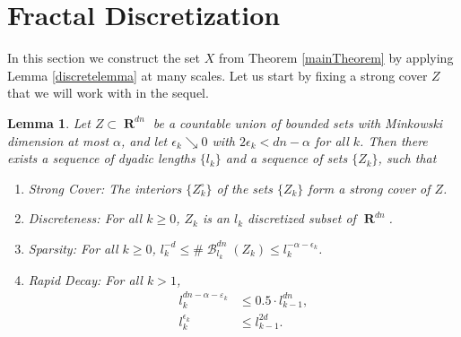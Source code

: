 \documentclass[dvipsnames,letterpaper,12pt]{article}
\numberwithin{equation}{section}
\theoremstyle{plain}
\newtheorem{lemma}{Lemma}
\theoremstyle{remark}
\DeclareMathOperator{\RR}{\mathbf{R}}
\DeclareMathOperator{\B}{\mathcal{B}}
\begin{document}
\section{Fractal Discretization}\label{discretizationsection}

In this section we construct the set $X$ from Theorem \ref{mainTheorem} by applying Lemma \ref{discretelemma} at many scales. Let us start by fixing a strong cover $Z$ that we will work with in the sequel.


\begin{lemma}\label{coveringLemma}
	Let $Z \subset \RR^{dn}$ be a countable union of bounded sets with Minkowski dimension at most $\alpha$, and let $\epsilon_k \searrow 0$ with $2\epsilon_k < dn - \alpha$ for all $k$. Then there exists a sequence of dyadic lengths $\{ l_k \}$ and a sequence of sets $\{ Z_k \}$, such that
	\begin{enumerate}
		\item\label{StrongCoverProperty} \emph{Strong Cover}: The interiors $\{ Z_k^\circ \}$ of the sets $\{ Z_k \}$ form a strong cover of $Z$.

		\item\label{DiscretenessProperty} \emph{Discreteness}: For all $k \geq 0$, $Z_k$ is an $l_k$ discretized subset of $\RR^{dn}$.

		\item\label{SparsityProperty} \emph{Sparsity}: For all $k \geq 0$, $l_k^{-d} \leq \#\B^{dn}_{l_k}(Z_k) \leq l_k^{-\alpha-\epsilon_k}$.

		\item\label{RapidDecayProperty} \emph{Rapid Decay}: For all $k > 1$,
			\begin{align}
				l_k^{dn-\alpha-\varepsilon_k} & \leq 0.5 \cdot l_{k-1}^{dn} \label{coverBoundRequirement}, \\
				l_k^{\epsilon_k} & \leq l_{k-1}^{2d}\label{quadDecayRequirement}.
			\end{align}
	\end{enumerate}
\end{lemma}
\end{document}
